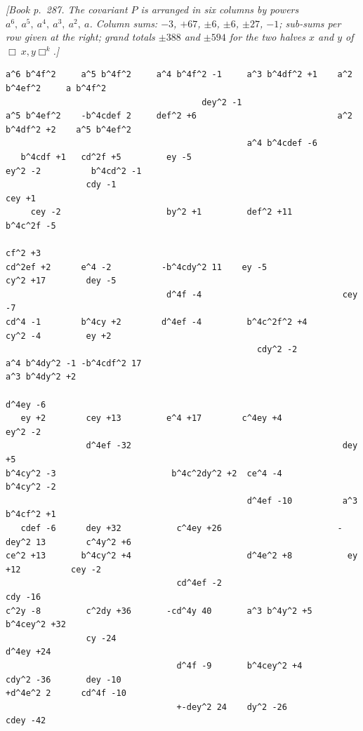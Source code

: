 \documentclass[11pt]{article}
\begin{document}
\textit{[Book p.~287. The covariant $P$ is arranged in six columns by powers $a^6,\ a^5,\ a^4,\ a^3,\ a^2,\ a$. Column sums: $-3$, $+67$, $\pm 6$, $\pm 6$, $\pm 27$, $-1$; sub-sums per row given at the right; grand totals $\pm 388$ and $\pm 594$ for the two halves $x$ and $y$ of $\Box\ x,y\Box^k$.]}

\smallskip

\begin{small}
\begin{verbatim}
a^6 b^4f^2     a^5 b^4f^2     a^4 b^4f^2 -1     a^3 b^4df^2 +1    a^2 b^4ef^2     a b^4f^2
                                       dey^2 -1
a^5 b^4ef^2    -b^4cdef 2     def^2 +6                            a^2 b^4df^2 +2    a^5 b^4ef^2
                                                a^4 b^4cdef -6
   b^4cdf +1   cd^2f +5         ey -5                              ey^2 -2          b^4cd^2 -1
                cdy -1                                                                cey +1
     cey -2                     by^2 +1         def^2 +11          b^4c^2f -5
                                                                                      cf^2 +3
cd^2ef +2      e^4 -2          -b^4cdy^2 11    ey -5               cy^2 +17        dey -5
                                d^4f -4                            cey -7
cd^4 -1        b^4cy +2        d^4ef -4         b^4c^2f^2 +4       cy^2 -4         ey +2
                                                  cdy^2 -2
a^4 b^4dy^2 -1 -b^4cdf^2 17                                                       a^3 b^4dy^2 +2
                                                                   d^4ey -6
   ey +2        cey +13         e^4 +17        c^4ey +4                                ey^2 -2
                d^4ef -32                                          dey +5
b^4cy^2 -3                       b^4c^2dy^2 +2  ce^4 -4                             b^4cy^2 -2
                                                d^4ef -10          a^3 b^4cf^2 +1
   cdef -6      dey +32           c^4ey +26                       -dey^2 13        c^4y^2 +6
ce^2 +13       b^4cy^2 +4                       d^4e^2 +8           ey +12          cey -2
                                  cd^4ef -2                                         cdy -16
c^2y -8         c^2dy +36       -cd^4y 40       a^3 b^4y^2 +5      b^4cey^2 +32
                cy -24                                                              d^4ey +24
                                  d^4f -9       b^4cey^2 +4         cdy^2 -36       dey -10
+d^4e^2 2      cd^4f -10
                                  +-dey^2 24    dy^2 -26            cdey -42

\end{verbatim}
\end{small}
\end{document}
